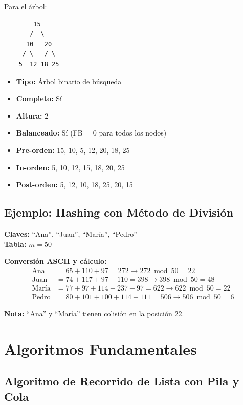 \documentclass[12pt,a4paper]{article}
\begin{document}
Para el árbol:
\begin{verbatim}
        15
       /  \
      10   20
     / \   / \
    5  12 18 25
\end{verbatim}

\begin{itemize}
    \item \textbf{Tipo:} Árbol binario de búsqueda
    \item \textbf{Completo:} Sí
    \item \textbf{Altura:} 2
    \item \textbf{Balanceado:} Sí (FB = 0 para todos los nodos)
    \item \textbf{Pre-orden:} 15, 10, 5, 12, 20, 18, 25
    \item \textbf{In-orden:} 5, 10, 12, 15, 18, 20, 25
    \item \textbf{Post-orden:} 5, 12, 10, 18, 25, 20, 15
\end{itemize}

\subsection{Ejemplo: Hashing con Método de División}

\textbf{Claves:} ``Ana'', ``Juan'', ``María'', ``Pedro''\\
\textbf{Tabla:} $m = 50$

\textbf{Conversión ASCII y cálculo:}
\begin{align*}
\text{Ana} &= 65 + 110 + 97 = 272 \rightarrow 272 \bmod 50 = 22\\
\text{Juan} &= 74 + 117 + 97 + 110 = 398 \rightarrow 398 \bmod 50 = 48\\
\text{María} &= 77 + 97 + 114 + 237 + 97 = 622 \rightarrow 622 \bmod 50 = 22\\
\text{Pedro} &= 80 + 101 + 100 + 114 + 111 = 506 \rightarrow 506 \bmod 50 = 6
\end{align*}

\textbf{Nota:} ``Ana'' y ``María'' tienen colisión en la posición 22.

\newpage

\section{Algoritmos Fundamentales}

\subsection{Algoritmo de Recorrido de Lista con Pila y Cola}
\end{document}
